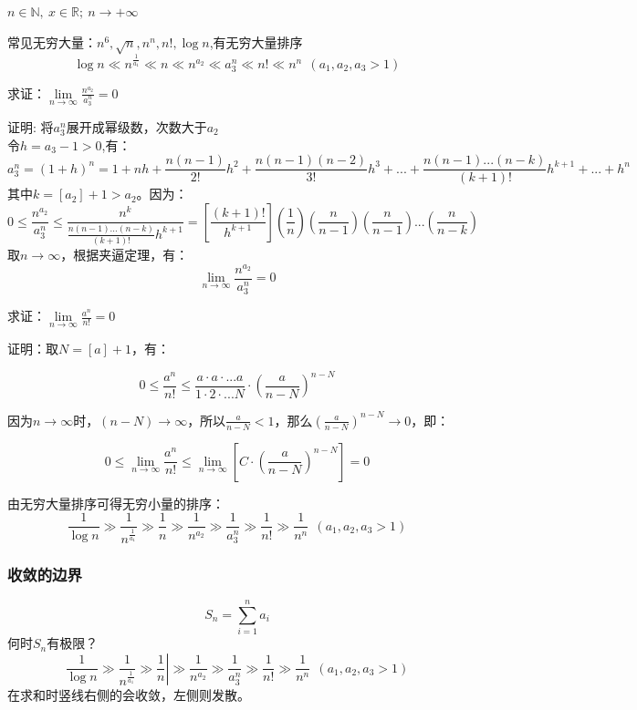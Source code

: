 $n \in \mathbb{N},\ x \in \mathbb{R};\ n \rightarrow +\infty$

常见无穷大量：$n^6,\sqrt{n},n^n,n!,\log n$,有无穷大量排序\\
\begin{equation}
\log n \ll n^{\frac{1}{a_1}} \ll n \ll n^{a_2} \ll a_3^{n} \ll n! \ll n^n \ \ (a_1,a_2,a_3>1)
\end{equation}

求证：$\lim\limits_{n \rightarrow \infty} \frac{n^{a_2}}{a_3^n}=0$

证明: 将$a_3^n$展开成幂级数，次数大于$a_2$\\
令$h = a_3-1>0$,有：\\
\[a_3^n = (1+h)^n = 1+nh+\frac{n(n-1)}{2!}h^2+\frac{n(n-1)(n-2)}{3!}h^3+...+\frac{n(n-1)...(n-k)}{(k+1)!}h^{k+1}+...+h^n\]
其中$k = [a_2]+1>a_2$。因为：\\
\[0 \le \frac{n^{a_2}}{a_3^n} \le \frac{n^k}{\frac{n(n-1)...(n-k)}{(k+1)!}h^{k+1}} = \left[\frac{(k+1)!}{h^{k+1}}\right]\left(\frac{1}{n}\right)\left(\frac{n}{n-1}\right)\left(\frac{n}{n-1}\right)...\left(\frac{n}{n-k}\right)\]
取$n\rightarrow\infty$，根据夹逼定理，有：
\[\lim\limits_{n \rightarrow \infty} \frac{n^{a_2}}{a_3^n}=0\]

求证：$\lim\limits_{n \rightarrow \infty} \frac{a^n}{n!} = 0$

证明：取$N=[a]+1$，有：

\[0 \le \frac{a^n}{n!} \le \frac{a\cdot a\cdot ...a}{1\cdot 2\cdot ...N}\cdot\left(\frac{a}{n-N}\right)^{n-N}\]

因为$n\rightarrow\infty$时，$(n-N)\rightarrow\infty$，所以$\frac{a}{n-N}<1$，那么$\left(\frac{a}{n-N}\right)^{n-N}\rightarrow0$，即：

\[0 \le \lim\limits_{n \rightarrow \infty} \frac{a^n}{n!} \le \lim\limits_{n \rightarrow \infty}[C\cdot\left(\frac{a}{n-N}\right)^{n-N}] = 0\]

由无穷大量排序可得无穷小量的排序：
\begin{equation}
\frac{1}{\log n} \gg \frac{1}{n^{\frac{1}{a_1}}} \gg \frac{1}{n} \gg \frac{1}{n^{a_2}} \gg \frac{1}{a_3^{n}} \gg \frac{1}{n!} \gg \frac{1}{n^n} \ \ (a_1,a_2,a_3>1)
\end{equation}
\subsubsection{收敛的边界}
\[S_n=\sum_{i=1}^{n}a_i\]
何时$S_n$有极限？
\begin{equation}
\left. \frac{1}{\log n} \gg \frac{1}{n^{\frac{1}{a_1}}} \gg \frac{1}{n} \right|\gg \frac{1}{n^{a_2}} \gg \frac{1}{a_3^{n}} \gg \frac{1}{n!} \gg \frac{1}{n^n} \ \ (a_1,a_2,a_3>1)
\end{equation}
在求和时竖线右侧的会收敛，左侧则发散。

